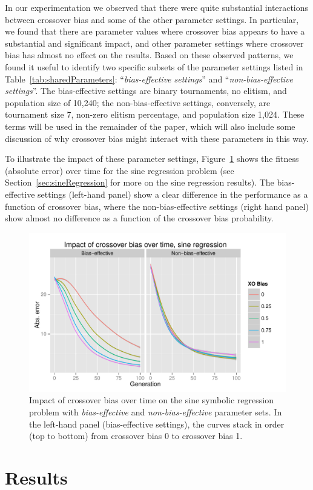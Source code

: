 \documentclass{sig-alternate}
\begin{document}
In our experimentation we observed that
there were quite substantial interactions between crossover bias and some of
the other parameter settings. In particular, we found that there are parameter values where crossover bias appears to
have a substantial and significant impact, and other parameter settings where crossover bias has almost no effect on
the results. Based on these observed patterns, we found it useful to identify two specific subsets of the parameter
settings listed in Table~\ref{tab:sharedParameters}: ``\emph{bias-effective settings}'' and ``\emph{non-bias-effective
settings}''. The bias-effective settings are binary tournaments, no elitism, and population size of 10,240; the
non-bias-effective settings, conversely, are tournament size 7, non-zero elitism percentage, and population size 1,024.
These terms will be used in the remainder of the paper, which will also include some discussion of why crossover bias
might interact with these parameters in this way.

To illustrate the impact of these parameter settings, 
Figure~\ref{fig:sineFitnessVsGenFacets} shows the fitness (absolute error) over time for the sine regression problem
(see Section~\ref{sec:sineRegression} for more on the sine regression results). 
The bias-effective settings (left-hand panel) show a clear difference in the performance as a function of 
crossover bias, where the non-bias-effective settings (right hand panel) show almost no difference as a function of
the crossover bias probability.

\begin{figure}
	\centering
	\includegraphics[width=0.45 \textwidth]{Plots/Sine_fitness_vs_gen_facets.pdf}
	\caption{Impact of crossover bias over time on the sine symbolic regression problem with
		\emph{bias-effective} and \emph{non-bias-effective} parameter sets. In the left-hand panel (bias-effective settings), the curves stack in order (top to bottom) from crossover bias 0 to crossover bias 1.}
	\label{fig:sineFitnessVsGenFacets}
\end{figure}

\section{Results} \label{sec:Results}
\end{document}
